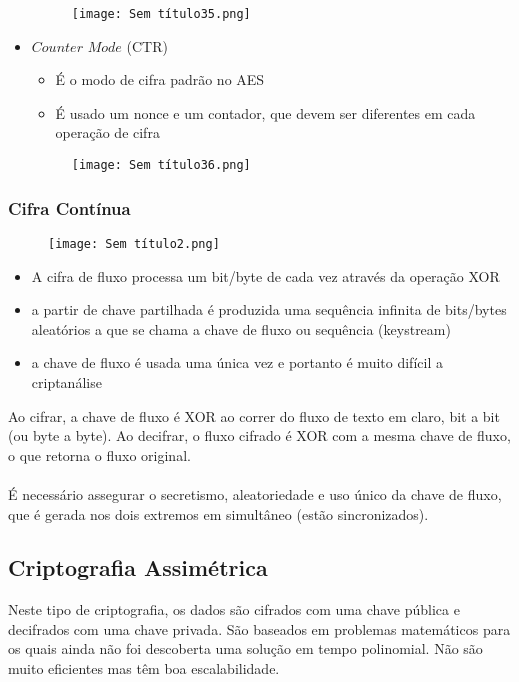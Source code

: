 \documentclass[10pt,a4paper]{report}
\begin{document}
\begin{itemize}
\begin{itemize}
\end{itemize}
\begin{figure}[H]
\centering
\texttt{[image: Sem título35.png]}
\end{figure}
\item $Counter$ $Mode$ (CTR)
\begin{itemize}
\item É o modo de cifra padrão no AES
\item É usado um nonce e um contador, que devem ser diferentes em cada operação de cifra
\end{itemize}
\begin{figure}[H]
\centering
\texttt{[image: Sem título36.png]}
\end{figure}
\end{itemize}
\subsubsection{Cifra Contínua}
\begin{figure}[H]
\centering
\texttt{[image: Sem título2.png]}
\end{figure}
\begin{itemize}
\item A cifra de fluxo processa um bit/byte de cada vez através da operação XOR
\item a partir de chave partilhada é produzida uma sequência infinita de bits/bytes aleatórios a que se chama a chave de fluxo ou sequência (keystream)
\item a chave de fluxo é usada uma única vez e portanto é muito difícil a criptanálise
\end{itemize}
Ao cifrar, a chave de fluxo é XOR ao correr do fluxo de texto em claro, bit a bit (ou byte a byte). Ao decifrar, o fluxo cifrado é XOR com a mesma chave de fluxo, o que retorna o fluxo original.\\
\\
É necessário assegurar o secretismo, aleatoriedade e uso único da chave de fluxo, que é gerada nos dois extremos em simultâneo (estão sincronizados).
\subsection{Criptografia Assimétrica}
Neste tipo de criptografia, os dados são cifrados com uma chave pública e decifrados com uma chave privada. São baseados em problemas matemáticos para os quais ainda não foi descoberta uma solução em tempo polinomial. Não são muito eficientes mas têm boa escalabilidade.
\end{document}
